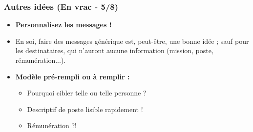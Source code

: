 \documentclass[slidetop,11pt]{beamer}
\begin{document}
\begin{frame}
	\frametitle{Autres id{\'e}es (En vrac - 5/8)}
	\begin{itemize}
		\item \textbf{Personnalisez les messages !}
		\item En soi, faire des messages g{\'e}n{\'e}rique est, peut-{\^e}tre, une bonne id{\'e}e ; 
			sauf pour les destinataires, qui n'auront aucune information (mission, poste, r{\'e}mun{\'e}ration...). 
		\item \textbf{Mod{\`e}le pr{\'e}-rempli ou {\`a} remplir : }
		\begin{itemize}
			\item Pourquoi cibler telle ou telle personne ?
			\item Descriptif de poste lisible rapidement !
			\item R{\'e}mun{\'e}ration ?!
		\end{itemize}
	\end{itemize} 
\end{frame}
\end{document}
